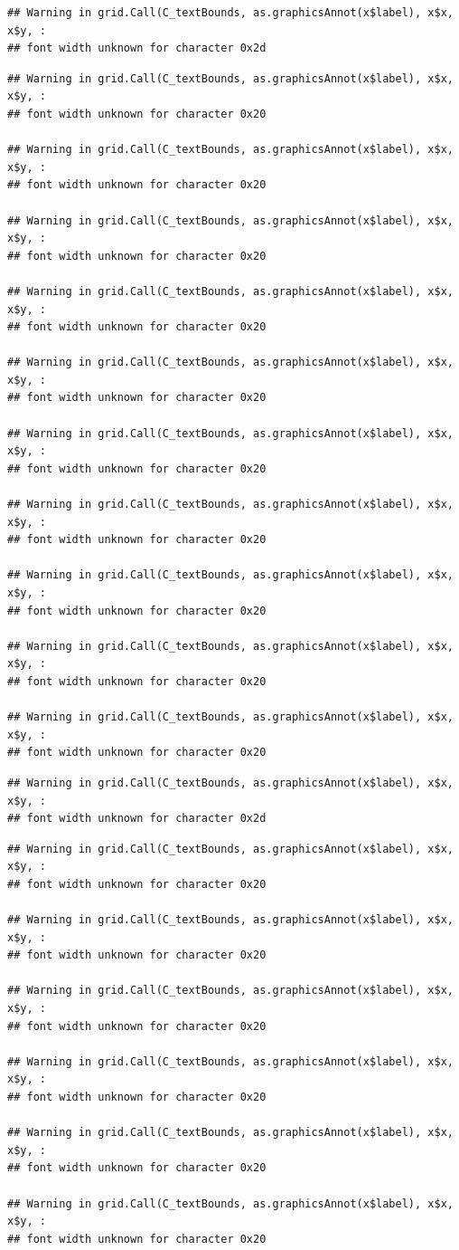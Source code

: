 \documentclass[]{article}
\theoremstyle{definition}
\theoremstyle{definition}
\theoremstyle{definition}
\theoremstyle{remark}
\begin{document}
\begin{verbatim}
## Warning in grid.Call(C_textBounds, as.graphicsAnnot(x$label), x$x, x$y, :
## font width unknown for character 0x2d
\end{verbatim}

\begin{verbatim}
## Warning in grid.Call(C_textBounds, as.graphicsAnnot(x$label), x$x, x$y, :
## font width unknown for character 0x20

## Warning in grid.Call(C_textBounds, as.graphicsAnnot(x$label), x$x, x$y, :
## font width unknown for character 0x20

## Warning in grid.Call(C_textBounds, as.graphicsAnnot(x$label), x$x, x$y, :
## font width unknown for character 0x20

## Warning in grid.Call(C_textBounds, as.graphicsAnnot(x$label), x$x, x$y, :
## font width unknown for character 0x20

## Warning in grid.Call(C_textBounds, as.graphicsAnnot(x$label), x$x, x$y, :
## font width unknown for character 0x20

## Warning in grid.Call(C_textBounds, as.graphicsAnnot(x$label), x$x, x$y, :
## font width unknown for character 0x20

## Warning in grid.Call(C_textBounds, as.graphicsAnnot(x$label), x$x, x$y, :
## font width unknown for character 0x20

## Warning in grid.Call(C_textBounds, as.graphicsAnnot(x$label), x$x, x$y, :
## font width unknown for character 0x20

## Warning in grid.Call(C_textBounds, as.graphicsAnnot(x$label), x$x, x$y, :
## font width unknown for character 0x20

## Warning in grid.Call(C_textBounds, as.graphicsAnnot(x$label), x$x, x$y, :
## font width unknown for character 0x20
\end{verbatim}

\begin{verbatim}
## Warning in grid.Call(C_textBounds, as.graphicsAnnot(x$label), x$x, x$y, :
## font width unknown for character 0x2d
\end{verbatim}

\begin{verbatim}
## Warning in grid.Call(C_textBounds, as.graphicsAnnot(x$label), x$x, x$y, :
## font width unknown for character 0x20

## Warning in grid.Call(C_textBounds, as.graphicsAnnot(x$label), x$x, x$y, :
## font width unknown for character 0x20

## Warning in grid.Call(C_textBounds, as.graphicsAnnot(x$label), x$x, x$y, :
## font width unknown for character 0x20

## Warning in grid.Call(C_textBounds, as.graphicsAnnot(x$label), x$x, x$y, :
## font width unknown for character 0x20

## Warning in grid.Call(C_textBounds, as.graphicsAnnot(x$label), x$x, x$y, :
## font width unknown for character 0x20

## Warning in grid.Call(C_textBounds, as.graphicsAnnot(x$label), x$x, x$y, :
## font width unknown for character 0x20
\end{verbatim}
\end{document}
